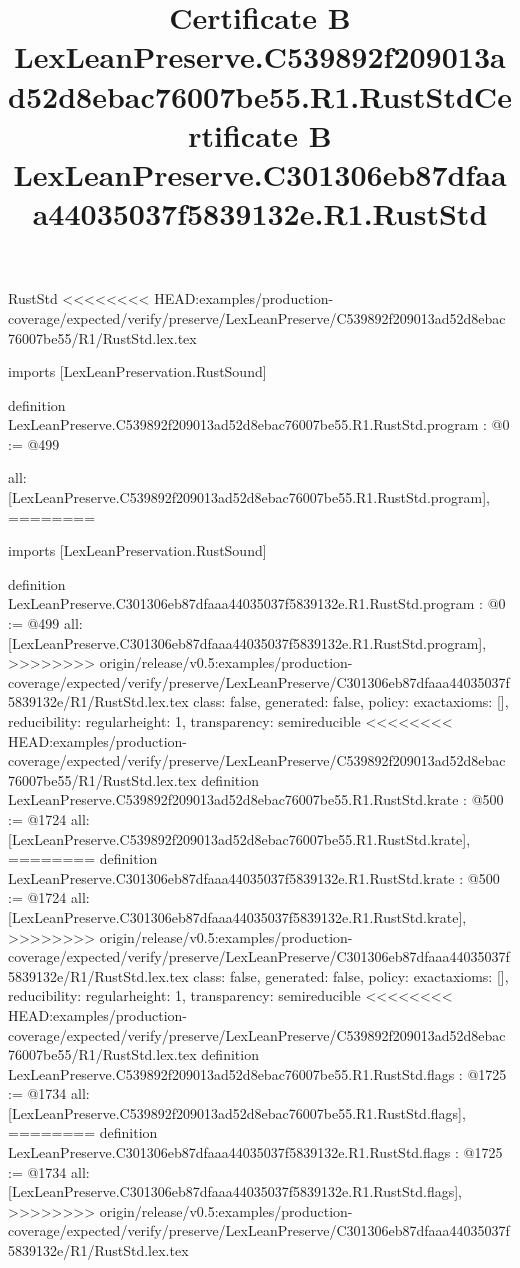 \begin{lexlean}{RustStd}
<<<<<<<< HEAD:examples/production-coverage/expected/verify/preserve/LexLeanPreserve/C539892f209013ad52d8ebac76007be55/R1/RustStd.lex.tex
\title{Certificate B LexLeanPreserve.C539892f209013ad52d8ebac76007be55.R1.RustStd}
\begin{coremodule}
imports [LexLeanPreservation.RustSound]

definition LexLeanPreserve.C539892f209013ad52d8ebac76007be55.R1.RustStd.program : @0 := @499 {
  all: [LexLeanPreserve.C539892f209013ad52d8ebac76007be55.R1.RustStd.program],
========
\title{Certificate B LexLeanPreserve.C301306eb87dfaaa44035037f5839132e.R1.RustStd}
\begin{coremodule}
imports [LexLeanPreservation.RustSound]

definition LexLeanPreserve.C301306eb87dfaaa44035037f5839132e.R1.RustStd.program : @0 := @499 {
  all: [LexLeanPreserve.C301306eb87dfaaa44035037f5839132e.R1.RustStd.program],
>>>>>>>> origin/release/v0.5:examples/production-coverage/expected/verify/preserve/LexLeanPreserve/C301306eb87dfaaa44035037f5839132e/R1/RustStd.lex.tex
  class: false,
  generated: false,
  policy: exact{axioms: []},
  reducibility: regular{height: 1},
  transparency: semireducible
}
<<<<<<<< HEAD:examples/production-coverage/expected/verify/preserve/LexLeanPreserve/C539892f209013ad52d8ebac76007be55/R1/RustStd.lex.tex
definition LexLeanPreserve.C539892f209013ad52d8ebac76007be55.R1.RustStd.krate : @500 := @1724 {
  all: [LexLeanPreserve.C539892f209013ad52d8ebac76007be55.R1.RustStd.krate],
========
definition LexLeanPreserve.C301306eb87dfaaa44035037f5839132e.R1.RustStd.krate : @500 := @1724 {
  all: [LexLeanPreserve.C301306eb87dfaaa44035037f5839132e.R1.RustStd.krate],
>>>>>>>> origin/release/v0.5:examples/production-coverage/expected/verify/preserve/LexLeanPreserve/C301306eb87dfaaa44035037f5839132e/R1/RustStd.lex.tex
  class: false,
  generated: false,
  policy: exact{axioms: []},
  reducibility: regular{height: 1},
  transparency: semireducible
}
<<<<<<<< HEAD:examples/production-coverage/expected/verify/preserve/LexLeanPreserve/C539892f209013ad52d8ebac76007be55/R1/RustStd.lex.tex
definition LexLeanPreserve.C539892f209013ad52d8ebac76007be55.R1.RustStd.flags : @1725 := @1734 {
  all: [LexLeanPreserve.C539892f209013ad52d8ebac76007be55.R1.RustStd.flags],
========
definition LexLeanPreserve.C301306eb87dfaaa44035037f5839132e.R1.RustStd.flags : @1725 := @1734 {
  all: [LexLeanPreserve.C301306eb87dfaaa44035037f5839132e.R1.RustStd.flags],
>>>>>>>> origin/release/v0.5:examples/production-coverage/expected/verify/preserve/LexLeanPreserve/C301306eb87dfaaa44035037f5839132e/R1/RustStd.lex.tex
}}}
\end{coremodule}}
\end{coremodule}
\end{lexlean}
